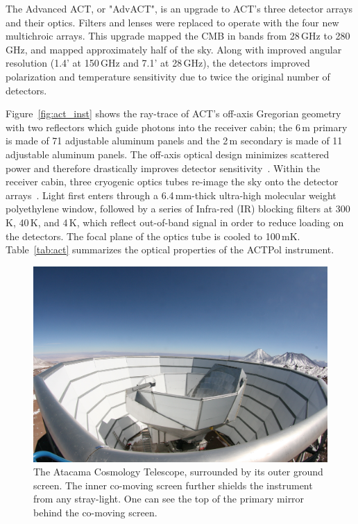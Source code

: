 The Advanced ACT, or "AdvACT", is an upgrade to ACT's three detector arrays and their optics.  Filters and lenses were replaced to operate with the four new multichroic arrays.  This upgrade mapped the CMB in bands from 28\,GHz to 280\,GHz, and mapped approximately half of the sky.  Along with improved angular resolution (1.4' at 150\,GHz and 7.1' at 28\,GHz), the detectors improved polarization and temperature sensitivity due to twice the original number of detectors.

Figure~\ref{fig:act_inst} shows the ray-trace of ACT's off-axis Gregorian geometry with two reflectors which guide photons into the receiver cabin; the 6\,m primary is made of 71 adjustable aluminum panels and the 2\,m secondary is made of 11 adjustable aluminum panels.  The off-axis optical design minimizes scattered power and therefore drastically improves detector sensitivity~\cite{fowler_2007}.  Within the receiver cabin, three cryogenic optics tubes re-image the sky onto the detector arrays~\cite{thornton_2016}.  Light first enters through a 6.4\,mm-thick ultra-high molecular weight polyethylene window, followed by a series of Infra-red (IR) blocking filters at 300\,K, 40\,K, and 4\,K, which reflect out-of-band signal in order to reduce loading on the detectors.  The focal plane of the optics tube is cooled to 100\,mK.   Table~\ref{tab:act} summarizes the optical properties of the ACTPol instrument.



\begin{figure}
    \centering
    \includegraphics[width = .9\textwidth]{Figures/act_inst_close.jpeg}
    \caption{The Atacama Cosmology Telescope, surrounded by its outer ground screen. The inner co-moving screen further shields the instrument from any stray-light.  One can see the top of the primary mirror behind the co-moving screen.}
    \label{fig:act_site}
\end{figure}

